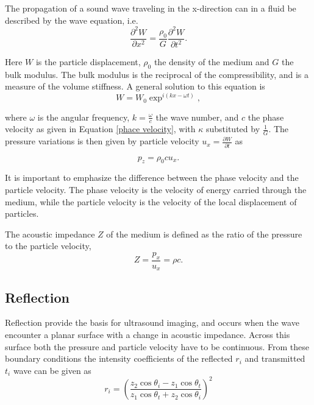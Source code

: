 The propagation of a sound wave traveling in the x-direction can in a fluid be described by the wave equation, i.e.
\begin{equation}
\label{wave equation}
\frac{\partial^2W}{\partial x^2} = \frac{\rho_0}{G}\frac{\partial^2W}{\partial t^2}.
\end{equation}

Here $W$ is the particle displacement, $\rho_0$ the density of the medium and $G$ the bulk modulus. The bulk modulus is the reciprocal of the compressibility, and is a measure of the volume stiffness. A general solution to this equation is 
\begin{equation}
\label{particle displacement}
W = W_0 \exp^{i(kx - \omega t)},
\end{equation}

where $\omega$ is the angular frequency, $k = \frac{\omega}{c}$ the wave number, and $c$ the phase velocity as given in Equation \eqref{phace velocity}, with $\kappa$ substituted by $\frac{1}{G}$. The pressure variations is then given by particle velocity $u_x = \frac{\partial W}{\partial t}$ as 

\begin{equation}
\label{pressure wave}
p_z = \rho_0 c u_x.
\end{equation}

It is important to emphasize the difference between the phase velocity and the particle velocity. The phase velocity is the velocity of energy carried through the medium, while the particle velocity is the velocity of the local displacement of particles.

The acoustic impedance $Z$ of the medium is defined as the ratio of the pressure to the particle velocity,
\begin{equation}
\label{acoustic impedance}
 Z = \frac{p_x}{u_x} = \rho c.
\end{equation}

 
\subsection{Reflection}
Reflection provide the basis for ultrasound imaging, and occurs when the wave encounter a planar surface with a change in acoustic impedance. Across this surface both the pressure and particle velocity have to be continuous. From these boundary conditions 
the intensity coefficients of the reflected $r_i$ and transmitted $t_i$ wave can be given as \cite{wells1969physical}
\begin{equation}
\label{fresnel}
r_i = \left(\frac{z_2 \cos \theta_i - z_1 \cos \theta_t}{z_1 \cos \theta_t + z_2 \cos \theta_i}\right)^2
\end{equation}

